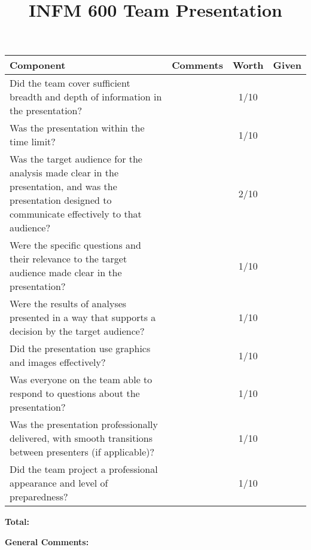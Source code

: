 \documentclass[12pt]{article}
\title{INFM 600 Team Presentation}
\date{\vspace{-10ex}}%
\newcommand\tab[1][0.25cm]{\hspace*{#1}}
\begin{document}
	\maketitle
		\renewcommand{\arraystretch}{2}
		\begin{tabulary}{6.5in}{| p{2.75in} | p{2.5in} | c | c |}
			\hline
			\textbf{Component} & \textbf{Comments} & \textbf{Worth} & \textbf{Given}\\
			\hline
			Did the team cover sufficient breadth and depth of information in the presentation?  & &  1/10 & \\
			\hline
			Was the presentation within the time limit? & & 1/10 &\\
			\hline
			Was the target audience for the analysis made clear in the presentation, and was the presentation designed to communicate effectively to that audience? & & 2/10 & \\
			\hline
			Were the specific questions and their relevance to the target audience made clear in the presentation? & & 1/10 & \\
			\hline
			Were the results of analyses presented in a way that supports a decision by the target audience? & & 1/10 & \\
			\hline
			Did the presentation use graphics and images effectively? & &  1/10 & \\
			\hline
			Was everyone on the team able to respond to questions about the presentation? & & 1/10 & \\
			\hline
			Was the presentation professionally delivered, with smooth transitions between presenters (if applicable)? & &  1/10 & \\
			\hline
			Did the team project a professional appearance and level of preparedness? & & 1/10 & \\
			\hline
		\end{tabulary}

\begin{flushright}
	\textbf{Total:}\tab[3.3cm]
\end{flushright}


	\textbf{General Comments:}

	
\end{document}
